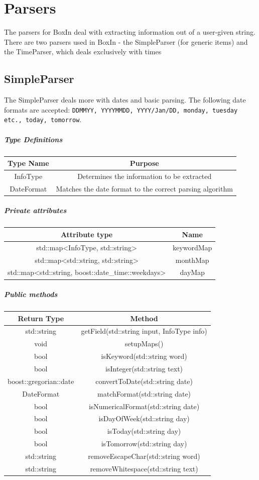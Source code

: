 \documentclass[12pt]{extarticle}
\begin{document}
\section{Parsers}
The parsers for BoxIn deal with extracting information out of a user-given string. There are two parsers used in BoxIn - the SimpleParser (for generic items) and the TimeParser, which deals exclusively with times

\subsection{SimpleParser}
The SimpleParser deals more with dates and basic parsing. The following date formats are accepted: \texttt{DDMMYY, YYYYMMDD, YYYY/Jan/DD, monday, tuesday etc., today, tomorrow}.\\

\subparagraph{Type Definitions}
\begin{tabular}{c c}
Type Name & Purpose\\
\hline
InfoType & Determines the information to be extracted\\
DateFormat & Matches the date format to the correct parsing algorithm\\
\end{tabular}

\subparagraph{Private attributes}
\begin{tabular}{c c}
Attribute type & Name\\
\hline
std::map<InfoType, std::string> & keywordMap\\
std::map<std::string, std::string> & monthMap\\
std::map<std::string, boost::date\_time::weekdays> & dayMap\\
\end{tabular}

\subparagraph{Public methods}
\begin{tabular}{c c}
Return Type & Method\\
\hline
std::string & getField(std::string input, InfoType info)\\
void & setupMaps()\\
bool & isKeyword(std::string word)\\
bool & isInteger(std::string text)\\
boost::gregorian::date & convertToDate(std::string date)\\
DateFormat & matchFormat(std::string date)\\
bool & isNumericalFormat(std::string date)\\
bool & isDayOfWeek(std::string day)\\
bool & isToday(std::string day)\\
bool & isTomorrow(std::string day)\\
std::string & removeEscapeChar(std::string word)\\
std::string & removeWhitespace(std::string text)\\
\end{tabular}
\end{document}
